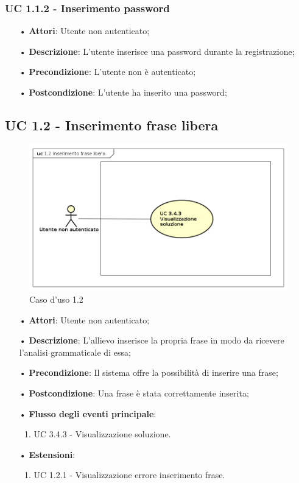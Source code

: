 \subsubsection{UC 1.1.2 - Inserimento password}
\begin{itemize}
\item[•]\textbf{Attori}: Utente non autenticato;
\item[•]\textbf{Descrizione}: L’utente inserisce una password durante la registrazione;
\item[•]\textbf{Precondizione}: L’utente non è autenticato;
\item[•]\textbf{Postcondizione}: L’utente ha inserito una password;
\end{itemize}

\subsection{UC 1.2 - Inserimento frase libera}
\begin{figure}[H]
\centering
\includegraphics[width=17cm]{img/UC12.png} 
\caption{Caso d'uso 1.2}\label{fig:12}
\end{figure}
\begin{itemize}
\item[•]\textbf{Attori}: Utente non autenticato;
\item[•]\textbf{Descrizione}: L’allievo inserisce la propria frase in modo da ricevere l’analisi grammaticale di essa;
\item[•]\textbf{Precondizione}: Il sistema offre la possibilità di inserire una frase;
\item[•]\textbf{Postcondizione}: Una frase è stata correttamente inserita;
\item[•]\textbf{Flusso degli eventi principale}:
\begin{enumerate}
\item UC 3.4.3 - Visualizzazione soluzione.
\end{enumerate}
\item[•]\textbf{Estensioni}:
\begin{enumerate}
\item UC 1.2.1 - Visualizzazione errore inserimento frase.
\end{enumerate}
\end{itemize}

